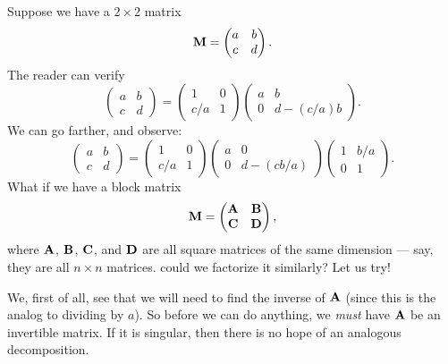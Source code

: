 Suppose we have a $2\times 2$ matrix
\begin{equation}
  \mathbf{M} = \begin{pmatrix}
    a & b\\
    c & d
\end{pmatrix}.
\end{equation}
The reader can verify
\begin{equation}
 \begin{pmatrix}
    a & b\\
    c & d
 \end{pmatrix} =
 \begin{pmatrix}
   1 & 0\\
   c/a & 1
 \end{pmatrix}
 \begin{pmatrix}a & b\\
   0 & d - (c/a)b
 \end{pmatrix}.
\end{equation}
We can go farther, and observe:
\begin{equation}
 \begin{pmatrix}
    a & b\\
    c & d
 \end{pmatrix} = 
 \begin{pmatrix}
   1 & 0\\
   c/a & 1
 \end{pmatrix}
 \begin{pmatrix}
   a & 0\\
   0 & d - (cb/a)
 \end{pmatrix}
 \begin{pmatrix}
   1 & b/a\\
   0 & 1
 \end{pmatrix}.
\end{equation}
What if we have a block matrix
\begin{equation}
  \mathbf{M} = \begin{pmatrix}
    \mathbf{A} & \mathbf{B}\\
    \mathbf{C} & \mathbf{D}
  \end{pmatrix},
\end{equation}
where $\mathbf{A}$, $\mathbf{B}$, $\mathbf{C}$, and $\mathbf{D}$ are all square
matrices of the same dimension --- say, they are all $n\times n$ matrices.
could we factorize it similarly? Let us try!

We, first of all, see that we will need to find the inverse of
$\mathbf{A}$ (since this is the analog to dividing by $a$). So before we
can do anything, we \emph{must} have $\mathbf{A}$ be an invertible
matrix. If it is singular, then there is no hope of an analogous
decomposition. 

